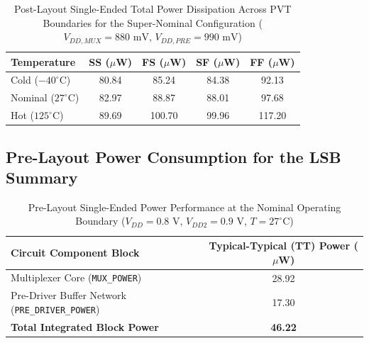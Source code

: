 \begin{table}[H]
    \centering
    \renewcommand{\arraystretch}{1.3}
    \setlength{\tabcolsep}{12pt}
    \small
    \begin{tabular}{|l|c|c|c|c|}
        \hline
        \textbf{Temperature} & \textbf{SS ($\mu$W)} & \textbf{FS ($\mu$W)} & \textbf{SF ($\mu$W)} & \textbf{FF ($\mu$W)} \\ \hline
        Cold ($-40^\circ\text{C}$) & 80.84 & 85.24 & 84.38 & 92.13 \\ \hline
        Nominal ($27^\circ\text{C}$) & 82.97 & 88.87 & 88.01 & 97.68 \\ \hline
        Hot ($125^\circ\text{C}$) & 89.69 & 100.70 & 99.96 & 117.20 \\ \hline
    \end{tabular}
    \vspace{2mm}
    \caption{Post-Layout Single-Ended Total Power Dissipation Across PVT Boundaries for the Super-Nominal Configuration ($V_{DD,MUX} = 880\text{ mV}$, $V_{DD,PRE} = 990\text{ mV}$)}
    \label{tab:post_layout_supernominal_power}
\end{table}

\subsection{Pre-Layout Power Consumption for the LSB Summary }
\begin{table}[H]
    \centering
    \renewcommand{\arraystretch}{1.3}
    \setlength{\tabcolsep}{14pt}
    \small
    \begin{tabular}{|l|c|}
        \hline
        \textbf{Circuit Component Block} & \textbf{Typical-Typical (TT) Power ($\mu$W)} \\ \hline
        Multiplexer Core (\texttt{MUX\_POWER}) & 28.92 \\ \hline
        Pre-Driver Buffer Network (\texttt{PRE\_DRIVER\_POWER}) & 17.30 \\ \hline
        \textbf{Total Integrated Block Power} & \textbf{46.22} \\ \hline
    \end{tabular}
    \vspace{2mm}
    \caption{Pre-Layout Single-Ended Power Performance at the Nominal Operating Boundary ($V_{DD} = 0.8\text{ V}$, $V_{DD2} = 0.9\text{ V}$, $T = 27^{\circ}\text{C}$)}
    \label{tab:pre_layout_tt_power}
\end{table}

